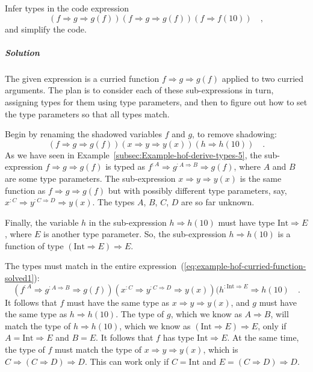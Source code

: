 Infer types in the code expression
\[
\left(f\Rightarrow g\Rightarrow g(f)\right)\left(f\Rightarrow g\Rightarrow g(f)\right)\left(f\Rightarrow f(10)\right)\quad,
\]
and simplify the code.

\subparagraph{Solution}

The given expression is a curried function $f\Rightarrow g\Rightarrow g(f)$
applied to two curried arguments. The plan is to consider each of
these sub-expressions in turn, assigning types for them using type
parameters, and then to figure out how to set the type parameters
so that all types match.

Begin by renaming the shadowed variables $f$ and $g$, to remove
shadowing:
\begin{equation}
\left(f\Rightarrow g\Rightarrow g(f)\right)\left(x\Rightarrow y\Rightarrow y(x)\right)\left(h\Rightarrow h(10)\right)\quad.\label{eq:example-hof-curried-function-solved1}
\end{equation}
 As we have seen in Example~\ref{subsec:Example-hof-derive-types-5},
the sub-expression $f\Rightarrow g\Rightarrow g(f)$ is typed as $f^{:A}\Rightarrow g^{:A\Rightarrow B}\Rightarrow g(f)$,
where $A$ and $B$ are some type parameters. The sub-expression $x\Rightarrow y\Rightarrow y(x)$
is the same function as $f\Rightarrow g\Rightarrow g(f)$ but with
possibly different type parameters, say, $x^{:C}\Rightarrow y^{:C\Rightarrow D}\Rightarrow y(x)$.
The types $A$, $B$, $C$, $D$ are so far unknown.

Finally, the variable $h$ in the sub-expression $h\Rightarrow h(10)$
must have type $\text{Int}\Rightarrow E$, where $E$ is another type
parameter. So, the sub-expression $h\Rightarrow h(10)$ is a function
of type $\left(\text{Int}\Rightarrow E\right)\Rightarrow E$.

The types must match in the entire expression~(\ref{eq:example-hof-curried-function-solved1}):
\begin{equation}
(f^{:A}\Rightarrow g^{:A\Rightarrow B}\Rightarrow g(f))(x^{:C}\Rightarrow y^{:C\Rightarrow D}\Rightarrow y(x))(h^{:\text{Int}\Rightarrow E}\Rightarrow h(10)\quad.\label{eq:example-hof-curried-function-solved2}
\end{equation}
It follows that $f$ must have the same type as $x\Rightarrow y\Rightarrow y(x)$,
and $g$ must have the same type as $h\Rightarrow h(10)$. The type
of $g$, which we know as $A\Rightarrow B$, will match the type of
$h\Rightarrow h(10)$, which we know as $\left(\text{Int}\Rightarrow E\right)\Rightarrow E$,
only if $A=\text{Int}\Rightarrow E$ and $B=E$. It follows that $f$
has type $\text{Int}\Rightarrow E$. At the same time, the type of
$f$ must match the type of $x\Rightarrow y\Rightarrow y(x)$, which
is $C\Rightarrow(C\Rightarrow D)\Rightarrow D$. This can work only
if $C=\text{Int}$ and $E=(C\Rightarrow D)\Rightarrow D$.

